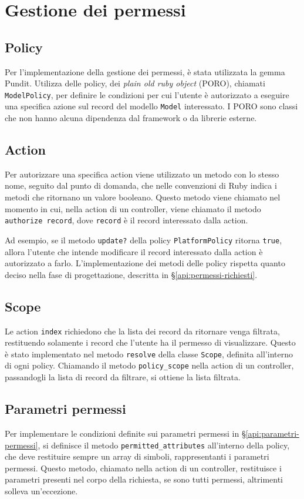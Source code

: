 \section{Gestione dei permessi}
\subsection{Policy}
Per l'implementazione della gestione dei permessi, è stata utilizzata la gemma Pundit. Utilizza delle policy, dei \emph{plain old ruby object} (PORO), chiamati \verb|ModelPolicy|, per definire le condizioni per cui l'utente è autorizzato a eseguire una specifica azione sul record del modello \verb|Model| interessato. I PORO sono classi che non hanno alcuna dipendenza dal framework o da librerie esterne.

\subsection{Action}
Per autorizzare una specifica action viene utilizzato un metodo con lo stesso nome, seguito dal punto di domanda, che nelle convenzioni di Ruby indica i metodi che ritornano un valore booleano. Questo metodo viene chiamato nel momento in cui, nella action di un controller, viene chiamato il metodo \verb|authorize record|, dove \verb|record| è il record interessato dalla action.

Ad esempio, se il metodo \verb|update?| della policy \verb|PlatformPolicy| ritorna \verb|true|, allora l'utente che intende modificare il record interessato dalla action è autorizzato a farlo. L'implementazione dei metodi delle policy rispetta quanto deciso nella fase di progettazione, descritta in \S \ref{api:permessi-richiesti}.

\subsection{Scope}
Le action \verb|index| richiedono che la lista dei record da ritornare venga filtrata, restituendo solamente i record che l'utente ha il permesso di visualizzare. Questo è stato implementato nel metodo \verb|resolve| della classe \verb|Scope|, definita all'interno di ogni policy. Chiamando il metodo \verb|policy_scope| nella action di un controller, passandogli la lista di record da filtrare, si ottiene la lista filtrata.

\subsection{Parametri permessi}
Per implementare le condizioni definite sui parametri permessi in \S \ref{api:parametri-permessi}, si definisce il metodo \verb|permitted_attributes| all'interno della policy, che deve restituire sempre un array di simboli, rappresentanti i parametri permessi. Questo metodo, chiamato nella action di un controller, restituisce i parametri presenti nel corpo della richiesta, se sono tutti permessi, altrimenti solleva un'eccezione.


